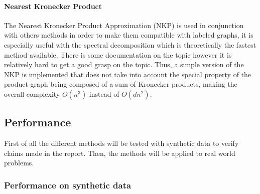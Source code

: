 \documentclass{article}
\theoremstyle{definition}
\begin{document}
\paragraph{Nearest Kronecker Product}
The Nearest Kronecker Product Approximation (NKP)\cite{van1993approximation} is used in conjunction with others methods in order to make them compatible with labeled graphs, it is especially useful with the spectral decomposition which is theoretically the fastest method available. There is some documentation on the topic however it is relatively hard to get a good grasp on the topic. Thus, a simple version of the NKP is implemented that does not take into account the special property of the product graph being composed of a sum of Kronecker products, making the overall complexity $O(n^3)$ instead of $O(dn^2)$.
	

\subsection{Performance}
First of all the different methods will be tested with synthetic data to verify claims made in the report. Then, the methods will be applied to real world problems. 
\subsubsection{Performance on synthetic data}
\end{document}
